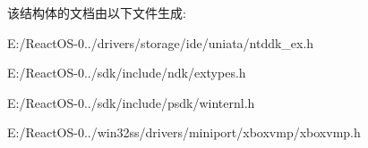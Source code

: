 该结构体的文档由以下文件生成\+:\begin{DoxyCompactItemize}
\item 
E\+:/\+React\+O\+S-\/0../drivers/storage/ide/uniata/ntddk\+\_\+ex.\+h\item 
E\+:/\+React\+O\+S-\/0../sdk/include/ndk/extypes.\+h\item 
E\+:/\+React\+O\+S-\/0../sdk/include/psdk/winternl.\+h\item 
E\+:/\+React\+O\+S-\/0../win32ss/drivers/miniport/xboxvmp/xboxvmp.\+h\end{DoxyCompactItemize}
